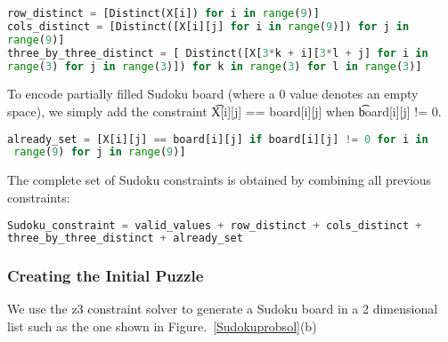 \singlespace
\begin{lstlisting}[language=python, frame = single]
row_distinct = [Distinct(X[i]) for i in range(9)]
cols_distinct = [Distinct([X[i][j] for i in range(9)]) for j in
range(9)] 
three_by_three_distinct = [ Distinct([X[3*k + i][3*l + j] for i in
range(3) for j in range(3)]) for k in range(3) for l in range(3)]

\end{lstlisting}
\doublespace

To encode partially filled Sudoku board (where a 0 value denotes an
empty space), we simply add the constraint \t{X[i][j] == board[i][j]} when
\t{board[i][j]} != 0. 

\singlespace
\begin{lstlisting}[language=python, frame = single]
 already_set = [X[i][j] == board[i][j] if board[i][j] != 0 for i in
 range(9) for j in range(9)]

\end{lstlisting}
\doublespace

The complete set of Sudoku constraints is obtained by
combining all previous constraints:

\singlespace
\begin{lstlisting}[language=python, frame = single]
Sudoku_constraint = valid_values + row_distinct + cols_distinct +
three_by_three_distinct + already_set
\end{lstlisting}
\doublespace


\subsubsection*{Creating the Initial Puzzle}
We use the z3 constraint solver to generate a Sudoku board in a 2
dimensional list such as the one shown in Figure.~\ref{Sudokuprobsol}(b)%

